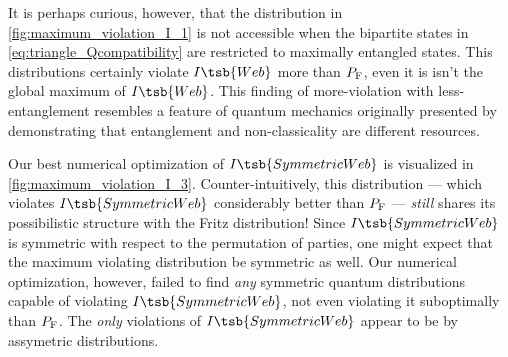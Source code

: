 \documentclass[aps, 10pt, english, twoside, pra, nofootinbib, tightenlines, longbibliography, superscriptaddress]{revtex4-1}
\begin{document}
    It is perhaps curious, however, that the distribution in \cref{fig:maximum_violation_I_1} is not accessible when the bipartite states in \cref{eq:triangle_Qcompatibility} are restricted to maximally entangled states. This distributions certainly violate $I\tsb{Web}$ more than $\prob[\fritz]$, even it is isn't the global maximum of $I\tsb{Web}$. This finding of more-violation with less-entanglement resembles a feature of quantum mechanics originally presented by~\citet{Methot_2006} demonstrating that entanglement and non-classicality are different resources.



    Our best numerical optimization of $I\tsb{SymmetricWeb}$ is visualized in \cref{fig:maximum_violation_I_3}. Counter-intuitively, this distribution --- which violates $I\tsb{SymmetricWeb}$ considerably better than $\prob[\fritz]$ --- \emph{still} shares its possibilistic structure with the Fritz distribution! Since $I\tsb{SymmetricWeb}$ is symmetric with respect to the permutation of parties, one might expect that the maximum violating distribution be symmetric as well. Our numerical optimization, however, failed to find \emph{any} symmetric quantum distributions capable of violating $I\tsb{SymmetricWeb}$, not even violating it suboptimally than $\prob[\fritz]$. The \emph{only} violations of $I\tsb{SymmetricWeb}$ appear to be by assymetric distributions.
\end{document}
